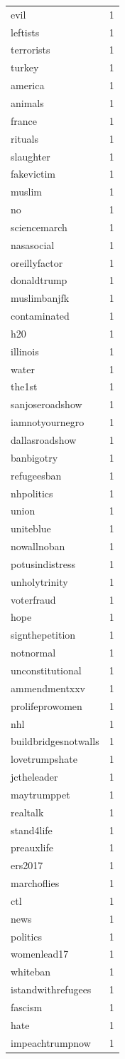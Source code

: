 \begin{tabular}{lr}
evil & 1 \\
leftists & 1 \\
terrorists & 1 \\
turkey & 1 \\
america & 1 \\
animals & 1 \\
france & 1 \\
rituals & 1 \\
slaughter & 1 \\
fakevictim & 1 \\
muslim & 1 \\
no & 1 \\
sciencemarch & 1 \\
nasasocial & 1 \\
oreillyfactor & 1 \\
donaldtrump & 1 \\
muslimbanjfk & 1 \\
contaminated & 1 \\
h20 & 1 \\
illinois & 1 \\
water & 1 \\
the1st & 1 \\
sanjoseroadshow & 1 \\
iamnotyournegro & 1 \\
dallasroadshow & 1 \\
banbigotry & 1 \\
refugeesban & 1 \\
nhpolitics & 1 \\
union & 1 \\
uniteblue & 1 \\
nowallnoban & 1 \\
potusindistress & 1 \\
unholytrinity & 1 \\
voterfraud & 1 \\
hope & 1 \\
signthepetition & 1 \\
notnormal & 1 \\
unconstitutional & 1 \\
ammendmentxxv & 1 \\
prolifeprowomen & 1 \\
nhl & 1 \\
buildbridgesnotwalls & 1 \\
lovetrumpshate & 1 \\
jctheleader & 1 \\
maytrumppet & 1 \\
realtalk & 1 \\
stand4life & 1 \\
preauxlife & 1 \\
ers2017 & 1 \\
marchoflies & 1 \\
ctl & 1 \\
news & 1 \\
politics & 1 \\
womenlead17 & 1 \\
whiteban & 1 \\
istandwithrefugees & 1 \\
fascism & 1 \\
hate & 1 \\
impeachtrumpnow & 1 \\
\bottomrule
\end{tabular}

